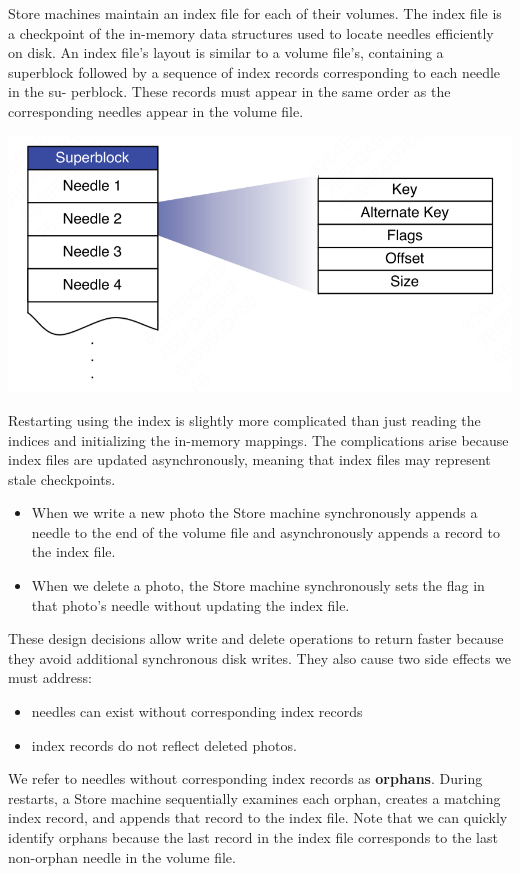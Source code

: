 \documentclass[11pt]{article}
\begin{document}
Store machines maintain an index file for each of their volumes. The index file is a checkpoint of the
in-memory data structures used to locate needles efficiently on disk. An index file’s layout is
similar to a volume file’s, containing a superblock followed by a sequence of index records
corresponding to each needle in the su- perblock. These records must appear in the same order as the
corresponding needles appear in the volume file.

\begin{center}
\includegraphics[width=.8\textwidth]{../../images/papers/138.png}
\end{center}

Restarting using the index is slightly more complicated than just reading the indices and initializing
the in-memory mappings. The complications arise because index files are updated asynchronously,
meaning that index files may represent stale checkpoints.
\begin{itemize}
\item When we write a new photo the Store machine synchronously appends a needle to the end of the volume
file and asynchronously appends a record to the index file.
\item When we delete a photo, the Store machine synchronously sets the flag in that photo’s needle without
updating the index file.
\end{itemize}
These design decisions allow write and delete operations to return faster because they avoid
additional synchronous disk writes. They also cause two side effects we must address:
\begin{itemize}
\item needles can exist without corresponding index records
\item index records do not reflect deleted photos.
\end{itemize}

We refer to needles without corresponding index records as \textbf{orphans}. During restarts, a Store machine
sequentially examines each orphan, creates a matching index record, and appends that record to the
index file. Note that we can quickly identify orphans because the last record in the index file
corresponds to the last non-orphan needle in the volume file.
\end{document}
